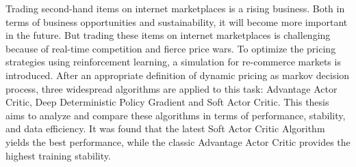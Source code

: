 Trading second-hand items on internet marketplaces is a rising business.
Both in terms of business opportunities and sustainability, it will become more important in the future.
But trading these items on internet marketplaces is challenging because of real-time competition and fierce price wars.
To optimize the pricing strategies using reinforcement learning, a simulation for re-commerce markets is introduced.
After an appropriate definition of dynamic pricing as markov decision process, three widespread algorithms are applied to this task:
Advantage Actor Critic, Deep Deterministic Policy Gradient and Soft Actor Critic.
This thesis aims to analyze and compare these algorithms in terms of performance, stability, and data efficiency.
It was found that the latest Soft Actor Critic Algorithm yields the best performance, while the classic Advantage Actor Critic provides the highest training stability.
